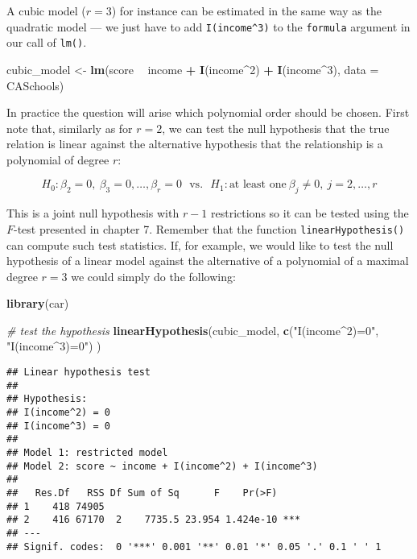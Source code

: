 \documentclass[]{book}
\newenvironment{Shaded}{\begin{snugshade}}{\end{snugshade}}
\newcommand{\KeywordTok}[1]{\textcolor[rgb]{0.13,0.29,0.53}{\textbf{#1}}}
\newcommand{\DataTypeTok}[1]{\textcolor[rgb]{0.13,0.29,0.53}{#1}}
\newcommand{\DecValTok}[1]{\textcolor[rgb]{0.00,0.00,0.81}{#1}}
\newcommand{\StringTok}[1]{\textcolor[rgb]{0.31,0.60,0.02}{#1}}
\newcommand{\CommentTok}[1]{\textcolor[rgb]{0.56,0.35,0.01}{\textit{#1}}}
\newcommand{\OperatorTok}[1]{\textcolor[rgb]{0.81,0.36,0.00}{\textbf{#1}}}
\newcommand{\NormalTok}[1]{#1}
\theoremstyle{definition}
\theoremstyle{definition}
\theoremstyle{definition}
\theoremstyle{remark}
\begin{document}
A cubic model (\(r=3\)) for instance can be estimated in the same way as
the quadratic model --- we just have to add \texttt{I(income\^{}3)} to
the \texttt{formula} argument in our call of \texttt{lm()}.

\begin{Shaded}
\begin{Highlighting}[]
\NormalTok{cubic_model <-}\StringTok{ }\KeywordTok{lm}\NormalTok{(score }\OperatorTok{~}\StringTok{ }\NormalTok{income }\OperatorTok{+}\StringTok{ }\KeywordTok{I}\NormalTok{(income}\OperatorTok{^}\DecValTok{2}\NormalTok{) }\OperatorTok{+}\StringTok{ }\KeywordTok{I}\NormalTok{(income}\OperatorTok{^}\DecValTok{3}\NormalTok{), }\DataTypeTok{data =}\NormalTok{ CASchools)}
\end{Highlighting}
\end{Shaded}

In practice the question will arise which polynomial order should be
chosen. First note that, similarly as for \(r=2\), we can test the null
hypothesis that the true relation is linear against the alternative
hypothesis that the relationship is a polynomial of degree \(r\):

\[ H_0: \beta_2=0, \ \beta_3=0,\dots,\beta_r=0 \ \ \ \text{vs.} \ \ \ H_1: \text{at least one} \ \beta_j\neq0, \ j=2,\dots,r \]

This is a joint null hypothesis with \(r-1\) restrictions so it can be
tested using the \(F\)-test presented in chapter 7. Remember that the
function \texttt{linearHypothesis()} can compute such test statistics.
If, for example, we would like to test the null hypothesis of a linear
model against the alternative of a polynomial of a maximal degree
\(r=3\) we could simply do the following:

\begin{Shaded}
\begin{Highlighting}[]
\KeywordTok{library}\NormalTok{(car)}

\CommentTok{# test the hypothesis}
\KeywordTok{linearHypothesis}\NormalTok{(cubic_model, }
                 \KeywordTok{c}\NormalTok{(}\StringTok{"I(income^2)=0"}\NormalTok{, }\StringTok{"I(income^3)=0"}\NormalTok{)}
\NormalTok{)}
\end{Highlighting}
\end{Shaded}

\begin{verbatim}
## Linear hypothesis test
## 
## Hypothesis:
## I(income^2) = 0
## I(income^3) = 0
## 
## Model 1: restricted model
## Model 2: score ~ income + I(income^2) + I(income^3)
## 
##   Res.Df   RSS Df Sum of Sq      F    Pr(>F)    
## 1    418 74905                                  
## 2    416 67170  2    7735.5 23.954 1.424e-10 ***
## ---
## Signif. codes:  0 '***' 0.001 '**' 0.01 '*' 0.05 '.' 0.1 ' ' 1
\end{verbatim}
\end{document}
